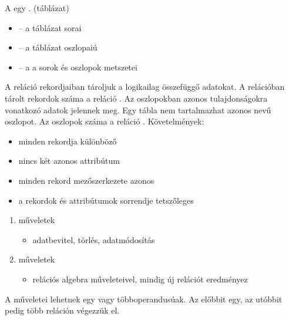 \documentclass[main.tex]{subfiles}
\begin{document}
  A  egy . (táblázat)
  \begin{itemize}
    \item {} \tabto{2.5cm} – \tabto{3.2cm}
    a táblázat sorai
    
    \item {} \tabto{2.5cm} – \tabto{3.2cm}
    a táblázat oszlopaiú

    \item {} \tabto{2.5cm} – \tabto{3.2cm} a
    a sorok és oszlopok metszetei
  \end{itemize}

  A reláció rekordjaiban tároljuk a logikailag összefüggő adatokat.
  A relációban tárolt rekordok száma a reláció .
  Az oszlopokban azonos tulajdonságokra vonatkozó adatok jelennek meg.
  Egy tábla nem tartalmazhat azonos nevű oszlopot.
  Az oszlopok száma a reláció . Követelmények:
  \begin{itemize}
    \item minden rekordja különböző
    \item nincs két azonos attribútum
    \item minden rekord mezőszerkezete azonos
    \item a rekordok és attribútumok sorrendje tetszőleges
  \end{itemize}
  
  \begin{enumerate}
    \item {} műveletek
    \begin{itemize}
      \item adatbevitel, törlés, adatmódosítás
    \end{itemize}

    \item {} műveletek
    \begin{itemize}
      \item relációs algebra műveleteivel,
      mindig új relációt eredményez
    \end{itemize}
  \end{enumerate}

  A  műveletei lehetnek
  egy vagy többoperandusúak. Az előbbit egy, az
  utóbbit pedig több reláción végezzük el.
  
\end{document}
